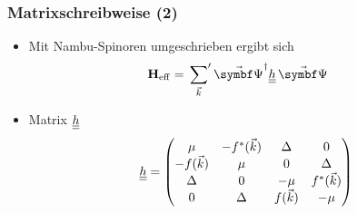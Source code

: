 \begin{frame}
    \frametitle{Matrixschreibweise (2)}
    \begin{itemize}
        \item Mit Nambu-Spinoren umgeschrieben ergibt sich 
        \begin{align*}
            \oHeff &= \sump{\vk} \vopsid \dul{h} \, \vopsi 
        \end{align*}
        \item Matrix $\underline{\underline{h}}$
        \begin{align*}
            \underline{\underline{h}} = \begin{pmatrix} \mu & -f^*({\vec{k}}) & \Delta & 0 \\ -f({\vec{k}}) & \mu & 0 & \Delta \\ \Delta & 0 & -\mu & f^*({\vec{k}}) \\ 0 & \Delta & f({\vec{k}}) & -\mu \end{pmatrix}
        \end{align*}
    \end{itemize}
\end{frame}

